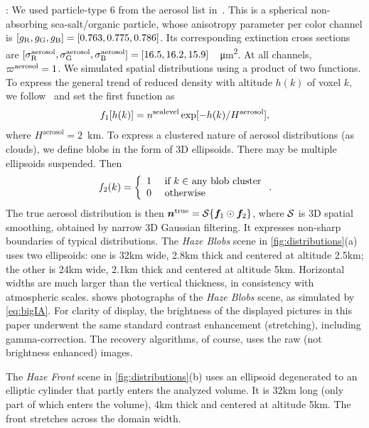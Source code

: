 \documentclass[10pt,letterpaper]{article}
\begin{document}
: We used particle-type 6 from the aerosol list
in~\cite{Martonchik2009}. This is a spherical non-absorbing
sea-salt/organic particle, whose anisotropy parameter per color
channel is $[g_{\rm R},g_{\rm G},g_{\rm B}]=[0.763,0.775,0.786]$. Its
corresponding extinction cross sections are $[\sigma^{\rm
  aerosol}_{\rm R}, \sigma^{\rm aerosol}_{\rm G}, \sigma^{\rm
  aerosol}_{\rm
  B}]=[16.5,16.2,15.9]$~\si[sticky-per]{\per\micro\meter\squared}.  At
all channels, $\varpi^{\rm aerosol}=1$. We simulated spatial
distributions using a product of two functions. To express the general
trend of reduced density with altitude $h(k)$ of voxel $k$, we
follow~\cite{Levi1980} and set the first function as
\begin{align}
  f_1[h(k)] = n^{\rm sealevel}
  \exp[-h(k)/H^\mathrm{aerosol}],
\end{align}
where $H^\mathrm{aerosol}=2$~\si{\km}. To express a clustered nature
of aerosol distributions (as clouds), we define blobs in the form of
3D ellipsoids. There may be multiple ellipsoids suspended.  Then
\begin{equation}
  f_2(k) =
  \left\{
    \begin{array}{ll}
      1  & \mbox{ if $k\in$ any blob cluster} \\
      0  & \mbox{ otherwise}
      \label{eq:f2}
    \end{array}
  \right.
  .
  \hspace{-0.05cm}
\end{equation}
The true aerosol distribution is then ${\bm n}^{\rm true}={\cal
  S}\{{\bm f}_1\odot {\bm f}_2\}$, where ${\cal S}$ is 3D spatial
smoothing, obtained by narrow 3D Gaussian filtering. It expresses
non-sharp boundaries of typical distributions. The {\em Haze Blobs}
scene in \cref{fig:distributions}(a) uses two ellipsoids: one is 32km
wide, 2.8km thick and centered at altitude 2.5km; the other is 24km
wide, 2.1km thick and centered at altitude 5km. Horizontal widths
are much larger than the vertical thickness, in consistency with
atmospheric scales.  shows
photographs of the {\em Haze Blobs} scene, as simulated by
\cref{eq:bigIA}. For clarity of display, the brightness of the
displayed pictures in this paper underwent the same standard
contrast enhancement (stretching), including gamma-correction.
The recovery algorithms, of course, uses the raw (not brightness
enhanced) images.


The {\em Haze Front} scene in \cref{fig:distributions}(b) uses an
ellipsoid degenerated to an elliptic cylinder that partly enters the
analyzed volume. It is 32km long (only part of which enters the
volume), 4km thick and centered at altitude 5km. The front stretches
across the domain width.
\end{document}
